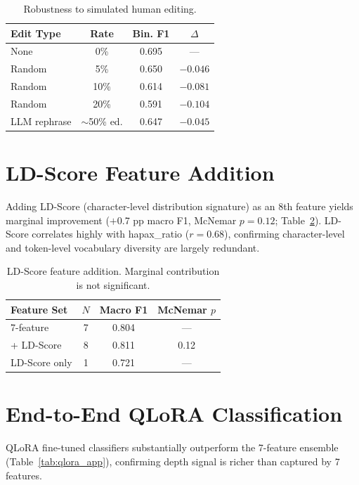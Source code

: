 \documentclass[11pt,a4paper]{article}
\begin{document}
\begin{table}[h]
\centering
\small
\begin{tabular}{lccc}
\toprule
\textbf{Edit Type} & \textbf{Rate} & \textbf{Bin. F1} & \textbf{$\Delta$} \\
\midrule
None & 0\% & 0.695 & — \\
Random & 5\% & 0.650 & $-0.046$ \\
Random & 10\% & 0.614 & $-0.081$ \\
Random & 20\% & 0.591 & $-0.104$ \\
LLM rephrase & $\sim$50\% ed. & 0.647 & $-0.045$ \\
\bottomrule
\end{tabular}
\caption{Robustness to simulated human editing.}
\label{tab:edit}
\end{table}

\section{LD-Score Feature Addition}
\label{app:ld}

Adding LD-Score (character-level distribution signature) as an 8th feature yields marginal improvement ($+$0.7 pp macro F1, McNemar $p = 0.12$; Table~\ref{tab:ld}).
LD-Score correlates highly with hapax\_ratio ($r = 0.68$), confirming character-level and token-level vocabulary diversity are largely redundant.

\begin{table}[h]
\centering
\small
\begin{tabular}{lccc}
\toprule
\textbf{Feature Set} & \textbf{$N$} & \textbf{Macro F1} & \textbf{McNemar $p$} \\
\midrule
7-feature & 7 & 0.804 & — \\
+ LD-Score & 8 & 0.811 & 0.12 \\
LD-Score only & 1 & 0.721 & — \\
\bottomrule
\end{tabular}
\caption{LD-Score feature addition. Marginal contribution is not significant.}
\label{tab:ld}
\end{table}

\section{End-to-End QLoRA Classification}
\label{app:qlora}

QLoRA fine-tuned classifiers substantially outperform the 7-feature ensemble (Table~\ref{tab:qlora_app}), confirming depth signal is richer than captured by 7 features.
\end{document}
